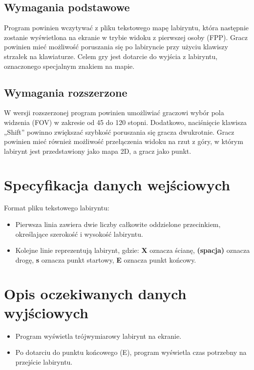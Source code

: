 \documentclass{article}
\begin{document}
\subsection{Wymagania podstawowe}
Program powinien wczytywać z pliku tekstowego mapę labiryntu, która następnie zostanie wyświetlona na ekranie w trybie widoku z pierwszej osoby (FPP). Gracz powinien mieć możliwość poruszania się po labiryncie przy użyciu klawiszy strzałek na klawiaturze. Celem gry jest dotarcie do wyjścia z labiryntu, oznaczonego specjalnym znakiem na mapie.

\subsection{Wymagania rozszerzone}
W wersji rozszerzonej program powinien umożliwiać graczowi wybór pola widzenia (FOV) w zakresie od 45 do 120 stopni. Dodatkowo, naciśnięcie klawisza „Shift” powinno zwiększać szybkość poruszania się gracza dwukrotnie. Gracz powinien mieć również możliwość przełączenia widoku na rzut z góry, w którym labirynt jest przedstawiony jako mapa 2D, a gracz jako punkt.

\section{Specyfikacja danych wejściowych}

Format pliku tekstowego labiryntu:
\begin{itemize}
    \item Pierwsza linia zawiera dwie liczby całkowite oddzielone przecinkiem, określające szerokość i wysokość labiryntu.
    \item Kolejne linie reprezentują labirynt, gdzie:
    \textbf X oznacza ścianę,
    \textbf{(spacja)} oznacza drogę,
    \textbf{s} oznacza punkt startowy,
    \textbf{E} oznacza punkt końcowy.
\end{itemize}

\section{Opis oczekiwanych danych wyjściowych}
\begin{itemize}
    \item Program wyświetla trójwymiarowy labirynt na ekranie.
    \item Po dotarciu do punktu końcowego (E), program wyświetla czas potrzebny na przejście labiryntu.
\end{itemize}
\end{document}
